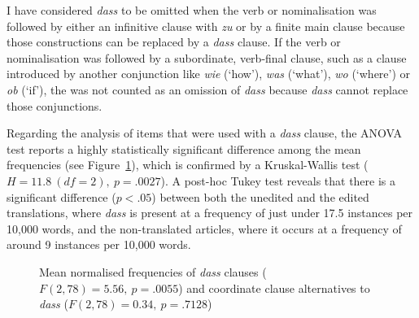 \documentclass[output=paper]{LSP/langsci}
\begin{document}
I have considered \emph{dass} to be omitted when the verb or nominalisation was followed by either an infinitive clause with \emph{zu} or by a finite main clause because those constructions can be replaced by a \emph{dass} clause. If the verb or nominalisation was followed by a subordinate, verb-final clause, such as a clause introduced by another conjunction like \emph{wie} (`how'), \emph{was} (`what'), \emph{wo} (`where') or \emph{ob} (`if'), the  was not counted as an omission of \emph{dass} because \emph{dass} cannot replace those conjunctions.

\newpage 
Regarding the analysis of items that were used with a \emph{dass} clause, the ANOVA test reports a highly statistically significant difference among the mean frequencies (see Figure~\ref{bisiada:fig:dass}), which is confirmed by a Kruskal-Wallis test ($H=11.8~(df=2),~p=.0027$). A post-hoc Tukey test reveals that there is a significant difference ($p<.05$) between both the unedited and the edited translations, where \emph{dass} is present at a frequency of just under 17.5 instances per 10,000 words, and the non-translated articles, where it occurs at a frequency of around 9 instances per 10,000 words.

\begin{figure}
  \caption{Mean normalised frequencies of \emph{dass} clauses ($F(2,78)=5.56,~p=.0055$) and coordinate clause alternatives to \emph{dass} ($F(2,78)=0.34,~p=.7128$)}\label{bisiada:fig:dass}
\end{figure}
\end{document}
